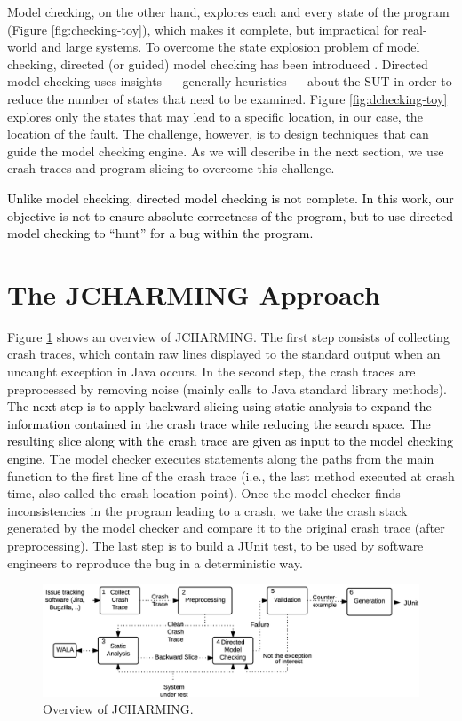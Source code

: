 \documentclass[times, doublespace]{smrauth}
\newcommand{\red}[1]{\textcolor{black}{#1}}
\begin{document}
Model checking, on the other hand, explores each and every state of the program
(Figure \ref{fig:checking-toy}), which makes it complete, but impractical for
real-world and large systems. To overcome the state explosion problem of
model checking, directed (or guided) model checking has been introduced
\cite{Edelkamp2004, Edelkamp2009}. Directed model checking uses insights --- generally
heuristics --- about the SUT in order to reduce the number of states
that need to be examined. Figure \ref{fig:dchecking-toy} explores only
the states that may lead to a specific location, in our case, the
location of the fault. The challenge, however, is to design techniques that
can guide the model checking engine. As we will describe in the next section,
we use crash traces and program slicing to overcome this challenge.

\red{Unlike model checking, directed model checking is not complete. In this work, our objective is not to ensure absolute correctness of the program, but to use directed model checking to ``hunt'' for a bug within the program.}

\section{The JCHARMING Approach\label{sec:jcharming}}

Figure \ref{fig:jcarming-approach} shows an overview of JCHARMING. The first step
consists of collecting crash traces, which contain raw lines
displayed to the standard output when an uncaught exception
in Java occurs. In the second step, the crash traces are
preprocessed by removing noise (mainly calls to Java standard
library methods). \red{The next step is to apply backward slicing
using static analysis to expand the information contained in
the crash trace while reducing the search space. The resulting
slice along with the crash trace are given as input to the model
checking engine.} The model checker executes statements
along the paths from the main function to the first line of the
crash trace (i.e., the last method executed at crash time, also
called the crash location point). Once the model checker finds
inconsistencies in the program leading to a crash, we take the
crash stack generated by the model checker and compare it to
the original crash trace (after preprocessing). The last step is
to build a JUnit test, to be used by software engineers to
reproduce the bug in a deterministic way.

\begin{figure}
  \centering
    \includegraphics[scale=0.8]{media/jcharming-approach.png}
    \caption{Overview of JCHARMING.
    \label{fig:jcarming-approach}}
\end{figure}
\end{document}
